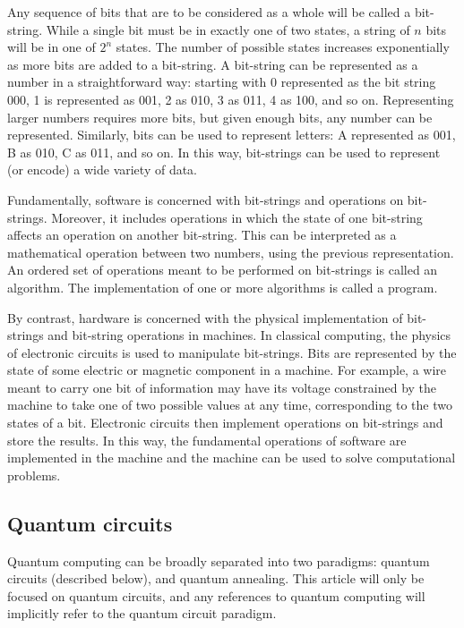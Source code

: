 \documentclass[%
 reprint,
nofootinbib,
 amsmath,amssymb,
 aps,
]{revtex4-2}
\begin{document}
Any sequence of bits that are to be considered as a whole will be called a bit-string. While a single bit must be in exactly one of two states, a string of $n$ bits will be in one of $2^n$ states. The number of possible states increases exponentially as more bits are added to a bit-string. A bit-string can be represented as a number in a straightforward way: starting with 0 represented as the bit string 000, 1 is represented as 001, 2 as 010, 3 as 011, 4 as 100, and so on. Representing larger numbers requires more bits, but given enough bits, any number can be represented. Similarly, bits can be used to represent letters: A represented as 001, B as 010, C as 011, and so on. In this way, bit-strings can be used to represent (or encode) a wide variety of data.

Fundamentally, software is concerned with bit-strings and operations on bit-strings. Moreover, it includes operations in which the state of one bit-string affects an operation on another bit-string. This can be interpreted as a mathematical operation between two numbers, using the previous representation. An ordered set of operations meant to be performed on bit-strings is called an algorithm. The implementation of one or more algorithms is called a program.

By contrast, hardware is concerned with the physical implementation of bit-strings and bit-string operations in machines. In classical computing, the physics of electronic circuits is used to manipulate bit-strings. Bits are represented by the state of some electric or magnetic component in a machine. For example, a wire meant to carry one bit of information may have its voltage constrained by the machine to take one of two possible values at any time, corresponding to the two states of a bit. Electronic circuits then implement operations on bit-strings and store the results. In this way, the fundamental operations of software are implemented in the machine and the machine can be used to solve computational problems.

\subsection{Quantum circuits}

Quantum computing can be broadly separated into two paradigms: quantum circuits (described below), and quantum annealing. This article will only be focused on quantum circuits, and any references to quantum computing will implicitly refer to the quantum circuit paradigm.
\end{document}
